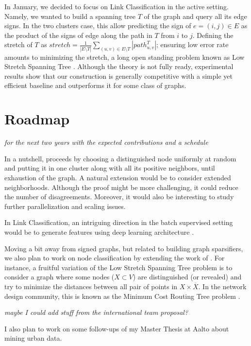 In January, we decided to focus on Link Classification in the active setting.
Namely, we wanted to build a spanning tree $T$ of the graph and query all its
edge signs. In the two clusters case, this allow predicting the sign of
$e=(i, j) \in E$ as the product of the signs of edge along the path in $T$ from
$i$ to $j$. Defining the stretch of $T$ as $stretch = \frac{1}{|E \setminus T|}
\sum_{(u,v) \in E \setminus T} |path^T_{u,v}|$; ensuring low error rate amounts
to minimizing the stretch, a long open standing problem known as Low Stretch
Spanning Tree \autocite{Abraham2012}.  Although the theory is not fully ready,
experimental results show that our construction is generally competitive with a
simple yet efficient baseline and outperforms it for some class of graphs.

\section{Roadmap}\label{roadmap}

\emph{for the next two years with the expected contributions and a
schedule}

In a nutshell, \kwik{} proceeds by choosing a distinguished node uniformly at
random and putting it in one cluster along with all its positive neighbors,
until exhaustion of the graph. A natural extension would be to consider
extended neighborhoods. Although the proof might be more challenging, it could
reduce the number of disagreements. Moreover, it would also be interesting to
study further parallelization and scaling issues.

In Link Classification, an intriguing direction in the batch supervised setting
would be to generate features using deep learning architecture
\autocites{Perozzi2014}{Yanardag2015}.

Moving a bit away from signed graphs, but related to building graph
sparsifiers, we also plan to work on node classification by extending the work
of \textcite{Vitale2012}. For instance, a fruitful variation of the Low Stretch
Spanning Tree problem is to consider a graph where some nodes ($X \subset V$)
are distinguished (or revealed) and try to minimize the distances between all
pair of points in $X \times \overline{X}$. In the network design community,
this is known as the Minimum Cost Routing Tree problem
\autocites{Johnson1978}{Connamacher2003}.

\emph{maybe I could add stuff from the international team proposal?}

I also plan to work on some follow-ups of my Master Thesis at Aalto
about mining urban data.

